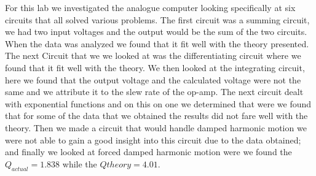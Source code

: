 For this lab we investigated the analogue computer looking specifically at six circuits that all solved various problems. The first circuit was a summing circuit, we had two input voltages and the output would be the sum of the two circuits. When the data was analyzed we found that it fit well with the theory presented. The next Circuit that we we looked at was the differentiating circuit where we found that it fit well with the theory. We then looked at the integrating circuit, here we found that the output voltage and the calculated voltage were not the same and we attribute it to the slew rate of the op-amp. The next circuit dealt with exponential functions and on this on one we determined that were we found that for some of the data that we obtained the results did not fare well with the theory. Then we made a circuit that would handle damped harmonic motion we were not able to gain a good insight into this circuit due to the data obtained; and finally we looked at forced damped harmonic motion were we found the $Q_{actual} = 1.838$ while the $Q{theory} = 4.01$.
